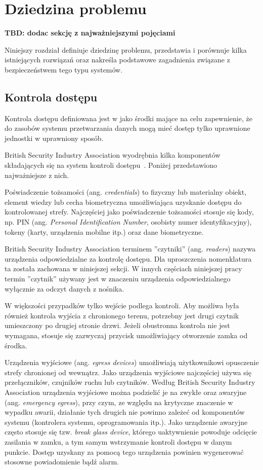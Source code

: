 \chapter{Dziedzina problemu}
\label{chap:problem-domain}
	\textbf{TBD: dodac sekcję z najważniejszymi pojęciami}

	Niniejszy rozdział definiuje dziedzinę problemu, przedstawia i porównuje kilka istniejących rozwiązań oraz nakreśla podstawowe zagadnienia związane z bezpieczeństwem tego typu systemów.

	\section{Kontrola dostępu}

		Kontrola dostępu definiowana jest w \cite{pkn2002} jako środki mające na celu zapewnienie, że do zasobów systemu przetwarzania danych mogą mieć dostęp tylko uprawnione jednostki w uprawniony sposób.

		British Security Industry Association wyodrębnia kilka komponentów składających się na system kontroli dostępu~\cite{bsia2016}. Poniżej przedstawiono najważniejsze z nich.

		Poświadczenie tożsamości (ang. \textit{credentials}) to fizyczny lub materialny obiekt, element wiedzy lub cecha biometryczna umożliwiająca uzyskanie dostępu do kontrolowanej strefy. Najczęściej jako poświadczenie tożsamości stosuje się kody, np. PIN (ang. \textit{Personal Identification Number}, osobisty numer identyfikacyjny), tokeny (karty, urządzenia mobilne itp.) oraz dane biometryczne.

		British Security Industry Association terminem ''czytniki'' (ang. \textit{readers}) nazywa urządzenia odpowiedzialne za kontrolę dostępu. Dla uproszczenia nomenklatura ta została zachowana w niniejszej sekcji. W innych częściach niniejszej pracy termin ''czytnik'' używany jest w znaczeniu urządzenia odpowiedzialnego wyłącznie za odczyt danych z nośnika.

		W większości przypadków tylko wejście podlega kontroli. Aby możliwa była również kontrola wyjścia z chronionego terenu, potrzebny jest drugi czytnik umieszczony po drugiej stronie drzwi. Jeżeli obustronna kontrola nie jest wymagana, stosuje się zazwyczaj przycisk umożliwiający otworzenie zamka od środka.

		Urządzenia wyjściowe (ang. \textit{egress devices}) umożliwiają użytkownikowi opusczenie strefy chronionej od wewnątrz. Jako urządzenia wyjściowe najczęściej używa się przełączników, czujników ruchu lub czytników. Według British Security Industry Association urządzenia wyjściowe można podzielić je na zwykłe oraz awaryjne (ang. \textit{emergency egress}), przy czym, ze względu na krytyczne znaczenie w wypadku awarii, działanie tych drugich nie powinno zależeć od komponentów systemu (kontrolera systemu, oprogramowania itp.). Jako urządzenie awaryjne często stosuje się tzw. \textit{break glass device}, którego uaktywnienie powoduje odcięcie zasilania w zamku, a tym samym wstrzymanie kontroli dostępu w danym punkcie. Dostęp uzyskany za pomocą tego urządzenia powinien wygenerować stosowne powiadomienie bądź alarm.

